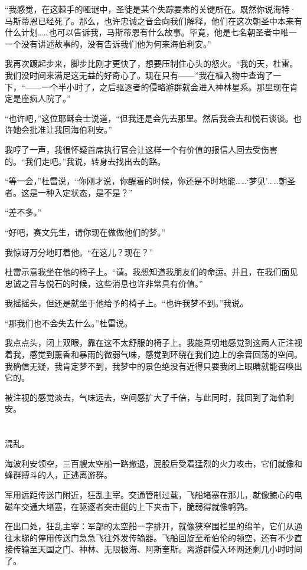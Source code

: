 \documentclass[AutoFakeBold=true]{book}
\begin{document}
``我感觉，在这棘手的哑谜中，圣徒是某个失踪要素的关键所在。既然你说海特·马斯蒂恩已经死了。那么，也许忠诚之音会向我们解释，他们在这次朝圣中本来有什么计划……也可以告诉我，马斯蒂恩有什么故事。毕竟，他是七名朝圣者中唯一一个没有讲述故事的，没有告诉我们他为何来海伯利安。''

我再次踱起步来，脚步比刚才更快了，想要压制住心头的怒火。``我的天，杜雷。我们没时间来满足这无益的好奇心了。现在只有——''我在植入物中查询了一下，``——一个半小时了，之后驱逐者的侵略游群就会进入神林星系。那里现在肯定是座疯人院了。''

``也许吧，''这位耶稣会士说道，``但我还是会先去那里。然后我会去和悦石谈谈。也许她会批准让我回海伯利安。''

我哼了一声，我很怀疑首席执行官会让这样一个有价值的报信人回去受伤害的。``我们走吧。''我说，转身去找出去的路。

``等一会，''杜雷说，``你刚才说，你醒着的时候，你还是不时地能……`梦见'……朝圣者。这是一种入定状态，是不是？''

``差不多。''

``好吧，赛文先生，请你现在做做他们的梦。''

我惊讶万分地盯着他。``在这儿？现在？''

杜雷示意我坐在他的椅子上。``请。我想知道我朋友们的命运。并且，在我们面见忠诚之音与悦石的时候，这些消息也许非常具有价值。''

我摇摇头，但还是就坐于他给予的椅子上。``也许我梦不到。''我说。

``那我们也不会失去什么。''杜雷说。

我点点头，闭上双眼，靠在这不太舒服的椅子上。我能真切地感觉到这两人正注视着我，感觉到薰香和暴雨的微弱气味，感觉到环绕在我们边上的余音回荡的空间。我确信无疑，我肯定梦不到，我梦中的景色绝没有近得只要我闭上眼睛就能召唤出它的。

被注视的感觉淡去，气味远去，空间感扩大了千倍，与此同时，我回到了海伯利安。

\chapter{}

混乱。

海波利安领空，三百艘太空船一路撤退，屁股后受着猛烈的火力攻击，它们就像和蜂群搏斗的人，正逃离游群。

军用远距传送门附近，狂乱主宰。交通管制过载，飞船堵塞在那儿，就像鲸心的电磁车交通大堵塞，在驱逐者突击艇的上下夹击下，脆弱得就像鹌鹑。

在出口处，狂乱主宰：军部的太空船一字排开，就像狭窄围栏里的绵羊，它们从通往末睇的停用传送门急急飞往外发传输器。飞船回旋至希伯伦的领空，还有不少直接传输至天国之门、神林、无限极海、阿斯奎斯。离游群侵入环网还剩几小时时间了。
\end{document}
